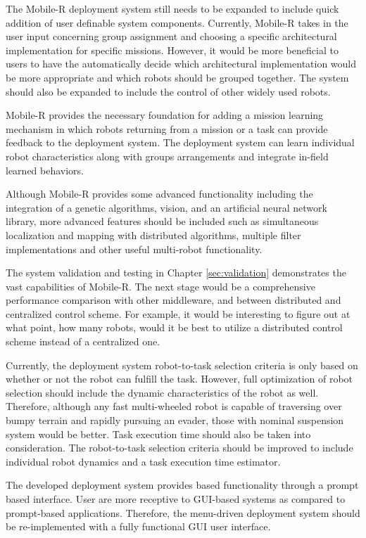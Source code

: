     The Mobile-R deployment system still needs to be expanded to include
      quick addition of user definable system components.
    Currently, Mobile-R takes in the user input concerning group assignment
      and choosing a specific architectural implementation for specific missions.
    However, it would be more beneficial to users to have the automatically 
      decide which architectural implementation would be more appropriate and 
      which robots should be grouped together.
    The system should also be expanded to include the control of other widely 
      used robots.

    Mobile-R provides the necessary foundation for adding a mission 
      learning mechanism in which robots returning from a mission or a task can
      provide feedback to the deployment system.
    The deployment system can learn individual robot characteristics along with
      groups arrangements and integrate in-field learned behaviors.

    Although Mobile-R provides some advanced functionality including 
      the integration of a genetic algorithms, vision, and an artificial neural 
      network library, more advanced features should be included such as
      simultaneous localization and mapping with distributed algorithms,
      multiple filter implementations and other useful multi-robot 
      functionality.

    The system validation and testing in Chapter \ref{sec:validation} 
      demonstrates the vast capabilities of Mobile-R.
    The next stage would be a comprehensive performance comparison with other
      middleware, and between distributed and centralized control scheme.
    For example, it would be interesting to figure out at what point, 
      how many robots, would it be best to utilize a distributed control 
      scheme instead of a centralized one.

    Currently, the deployment system robot-to-task selection criteria is only
      based on whether or not the robot can fulfill the task. 
    However, full optimization of robot selection should include the dynamic
      characteristics of the robot as well.
    Therefore, although any fast multi-wheeled robot is capable of traversing 
      over bumpy terrain and rapidly pursuing an evader, those with nominal
      suspension system would be better.
    Task execution time should also be taken into consideration.
    The robot-to-task selection criteria should be improved to include 
      individual robot dynamics and a task execution time estimator.

    The developed deployment system provides based functionality through a
      prompt based interface.
    User are more receptive to GUI-based systems as compared to prompt-based
      applications.
    Therefore, the menu-driven deployment system should be re-implemented
      with a fully functional GUI user interface.
 

